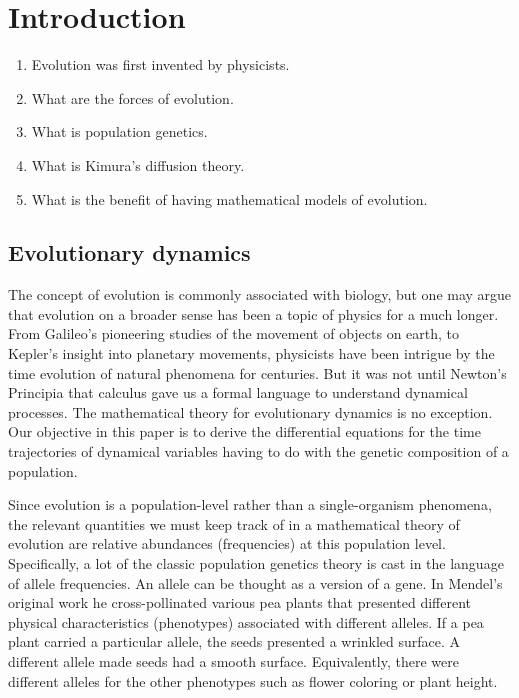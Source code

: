 \section{Introduction}

\begin{enumerate}
    \item Evolution was first invented by physicists.
    \item What are the forces of evolution.
    \item What is population genetics.
    \item What is Kimura's diffusion theory.
    \item What is the benefit of having mathematical models of evolution.
\end{enumerate}

\subsection{Evolutionary dynamics}

\noindent
The concept of evolution is commonly associated with biology, but one may argue
that evolution on a broader sense has been a topic of physics for a much longer.
From Galileo's pioneering studies of the movement of objects on earth, to
Kepler's insight into planetary movements, physicists have been intrigue by the
time evolution of natural phenomena for centuries. But it was not until Newton's
Principia that calculus gave us a formal language to understand dynamical
processes. The mathematical theory for evolutionary dynamics is no exception.
Our objective in this paper is to derive the differential equations for the time
trajectories of dynamical variables having to do with the genetic composition of
a population.

Since evolution is a population-level rather than a single-organism phenomena,
the relevant quantities we must keep track of in a mathematical theory of
evolution are relative abundances (frequencies) at this population level.
Specifically, a lot of the classic population genetics theory is cast in the
language of allele frequencies. An allele can be thought as a version of a gene.
In Mendel's original work he cross-pollinated various pea plants that presented
different physical characteristics (phenotypes) associated with different
alleles. If a pea plant carried a particular allele, the seeds presented a
wrinkled surface. A different allele made seeds had a smooth surface.
Equivalently, there were different alleles for the other phenotypes such as
flower coloring or plant height.

